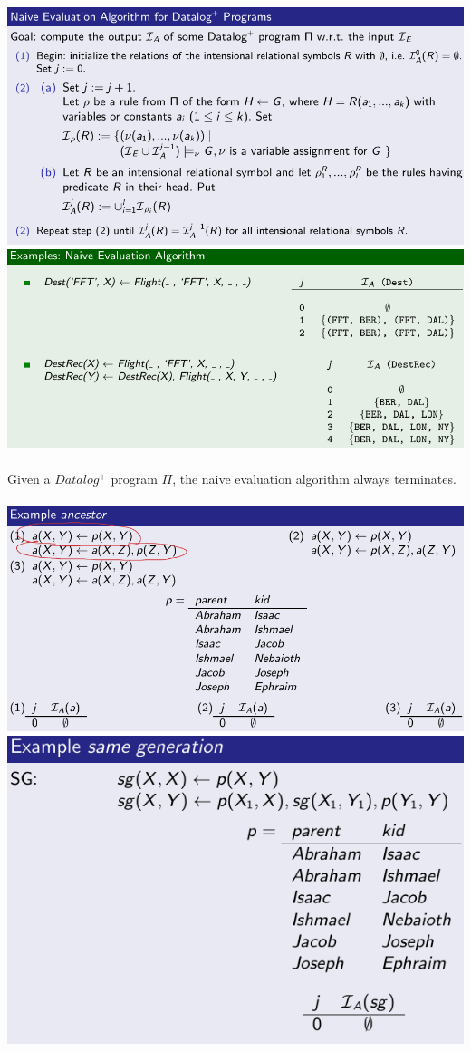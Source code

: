 \documentclass{article}
\begin{document}
\includegraphics[scale=0.3]{78.png}\\
\includegraphics[scale=0.3]{79.png}\\\\
Given a $Datalog^+$ program $\Pi$, the naive evaluation algorithm always terminates.\\\\
\includegraphics[scale=0.3]{80.png}
\includegraphics[scale=0.3]{81.png}\\\\
\end{document}
